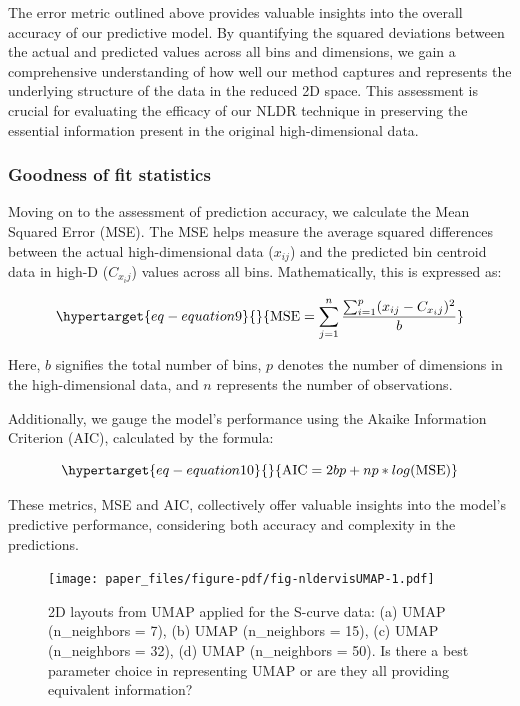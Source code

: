 \documentclass[
  12pt]{article}
\begin{document}
The error metric outlined above provides valuable insights into the
overall accuracy of our predictive model. By quantifying the squared
deviations between the actual and predicted values across all bins and
dimensions, we gain a comprehensive understanding of how well our method
captures and represents the underlying structure of the data in the
reduced 2D space. This assessment is crucial for evaluating the efficacy
of our NLDR technique in preserving the essential information present in
the original high-dimensional data.

\hypertarget{sec-goodfit}{%
\subsubsection{Goodness of fit statistics}\label{sec-goodfit}}

Moving on to the assessment of prediction accuracy, we calculate the
Mean Squared Error (MSE). The MSE helps measure the average squared
differences between the actual high-dimensional data (\(x_{ij}\)) and
the predicted bin centroid data in high-D (\(C_{x_ij}\)) values across
all bins. Mathematically, this is expressed as:

\begin{equation}\protect\hypertarget{eq-equation9}{}{
\text{MSE} = \sum_{j = 1}^{n} \frac{\sum_{i = 1}^{p} (x_{ij} - C_{x_ij})^2}{b}
}\label{eq-equation9}\end{equation}

Here, \(b\) signifies the total number of bins, \(p\) denotes the number
of dimensions in the high-dimensional data, and \(n\) represents the
number of observations.

Additionally, we gauge the model's performance using the Akaike
Information Criterion (AIC), calculated by the formula:

\begin{equation}\protect\hypertarget{eq-equation10}{}{
\text{AIC} = 2bp + np * log(\text{MSE})
}\label{eq-equation10}\end{equation}

These metrics, MSE and AIC, collectively offer valuable insights into
the model's predictive performance, considering both accuracy and
complexity in the predictions.

\begin{figure}

{\centering \texttt{[image: paper\_files/figure-pdf/fig-nldervisUMAP-1.pdf]}

}

\caption{\label{fig-nldervisUMAP}2D layouts from UMAP applied for the
S-curve data: (a) UMAP (n\_neighbors = 7), (b) UMAP (n\_neighbors = 15),
(c) UMAP (n\_neighbors = 32), (d) UMAP (n\_neighbors = 50). Is there a
best parameter choice in representing UMAP or are they all providing
equivalent information?}

\end{figure}
\end{document}
